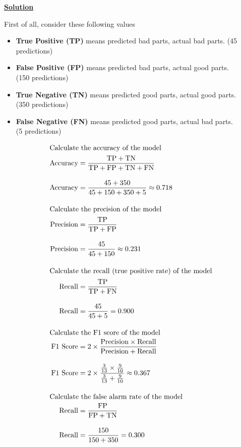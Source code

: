 \documentclass[12pt, a4paper]{article}
\begin{document}
            \vspace{1em}

            \noindent \underline{\textbf{Solution}}
            
            \noindent First of all, consider these following values
            \begin{itemize}
                \item \textbf{True Positive (TP)} means predicted bad parts, actual bad parts. (45 predictions)
                \item \textbf{False Positive (FP)} means predicted bad parts, actual good parts. \\ (150 predictions)
                \item \textbf{True Negative (TN)} means predicted good parts, actual good parts. \\ (350 predictions)
                \item \textbf{False Negative (FN)} means predicted good parts, actual bad parts. \\ (5 predictions)
            \end{itemize}
            \begin{align*}
                \intertext{Calculate the accuracy of the model}
                \text{Accuracy} &= \frac{\text{TP} + \text{TN}}{\text{TP} + \text{FP} + \text{TN} + \text{FN}} \\[1em]
                \text{Accuracy} &= \frac{45 + 350}{45 + 150 + 350 + 5} \approx 0.718 \\[1em]
                \intertext{Calculate the precision of the model}
                \text{Precision} &= \frac{\text{TP}}{\text{TP} + \text{FP}} \\[1em]
                \text{Precision} &= \frac{45}{45 + 150} \approx 0.231 \\[1em]
                \intertext{Calculate the recall (true positive rate) of the model}
                \text{Recall} &= \frac{\text{TP}}{\text{TP} + \text{FN}} \\[1em]
                \text{Recall} &= \frac{45}{45 + 5} = 0.900 \\[1em]
                \intertext{Calculate the F1 score of the model}
                \text{F1 Score} &= 2 \times \frac{\text{Precision} \times \text{Recall}}{\text{Precision} + \text{Recall}} \\[1em]
                \text{F1 Score} &= 2 \times \frac{\frac{3}{13} \times \frac{9}{10}}{\frac{3}{13} + \frac{9}{10}} \approx 0.367 \\[1em]
                \intertext{Calculate the false alarm rate of the model}
                \text{Recall} &= \frac{\text{FP}}{\text{FP} + \text{TN}} \\[1em]
                \text{Recall} &= \frac{150}{150 + 350} = 0.300
            \end{align*}
\end{document}
